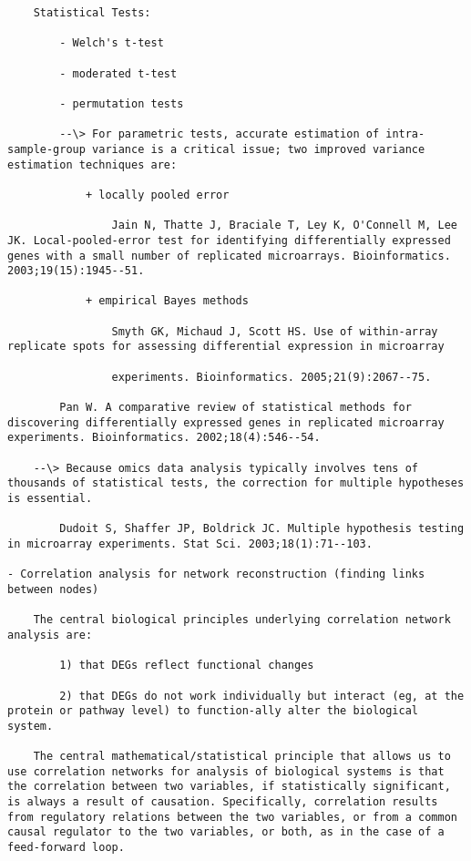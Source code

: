 \documentclass[
]{book}
\begin{document}
\begin{verbatim}
    Statistical Tests:

        - Welch's t-test

        - moderated t-test

        - permutation tests

        --\> For parametric tests, accurate estimation of intra-sample-group variance is a critical issue; two improved variance estimation techniques are:

            + locally pooled error

                Jain N, Thatte J, Braciale T, Ley K, O'Connell M, Lee JK. Local-pooled-error test for identifying differentially expressed genes with a small number of replicated microarrays. Bioinformatics. 2003;19(15):1945--51.

            + empirical Bayes methods

                Smyth GK, Michaud J, Scott HS. Use of within-array replicate spots for assessing differential expression in microarray

                experiments. Bioinformatics. 2005;21(9):2067--75.

        Pan W. A comparative review of statistical methods for discovering differentially expressed genes in replicated microarray experiments. Bioinformatics. 2002;18(4):546--54.

    --\> Because omics data analysis typically involves tens of thousands of statistical tests, the correction for multiple hypotheses is essential.

        Dudoit S, Shaffer JP, Boldrick JC. Multiple hypothesis testing in microarray experiments. Stat Sci. 2003;18(1):71--103.

- Correlation analysis for network reconstruction (finding links between nodes)

    The central biological principles underlying correlation network analysis are:

        1) that DEGs reflect functional changes

        2) that DEGs do not work individually but interact (eg, at the protein or pathway level) to function-ally alter the biological system.

    The central mathematical/statistical principle that allows us to use correlation networks for analysis of biological systems is that the correlation between two variables, if statistically significant, is always a result of causation. Specifically, correlation results from regulatory relations between the two variables, or from a common causal regulator to the two variables, or both, as in the case of a feed-forward loop.


\end{verbatim}
\end{document}
